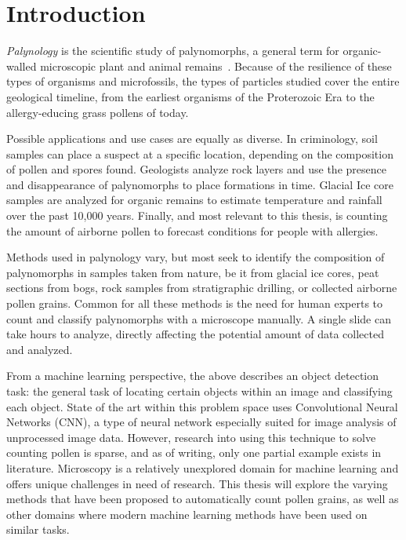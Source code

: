 \chapter{Introduction}\label{cha:Introduction}
\textit{Palynology} is the scientific study of palynomorphs, a general term for organic-walled microscopic plant and animal remains\ \parencite{askin_palynology_2003}.
Because of the resilience of these types of organisms and microfossils, the types of particles studied cover the entire geological timeline, from the earliest organisms of the Proterozoic Era to the allergy-educing grass pollens of today.

Possible applications and use cases are equally as diverse.
In criminology, soil samples can place a suspect at a specific location, depending on the composition of pollen and spores found.
Geologists analyze rock layers and use the presence and disappearance of palynomorphs to place formations in time.
Glacial Ice core samples are analyzed for organic remains to estimate temperature and rainfall over the past 10,000 years.
Finally, and most relevant to this thesis, is counting the amount of airborne pollen to forecast conditions for people with allergies.

Methods used in palynology vary, but most seek to identify the composition of palynomorphs in samples taken from nature, be it from glacial ice cores, peat sections from bogs, rock samples from stratigraphic drilling, or collected airborne pollen grains.
Common for all these methods is the need for human experts to count and classify palynomorphs with a microscope manually.
A single slide can take hours to analyze, directly affecting the potential amount of data collected and analyzed.

From a machine learning perspective, the above describes an object detection task: the general task of locating certain objects within an image and classifying each object.
State of the art within this problem space uses Convolutional Neural Networks (CNN), a type of neural network especially suited for image analysis of unprocessed image data.
However, research into using this technique to solve counting pollen is sparse, and as of writing, only one partial example exists in literature.
Microscopy is a relatively unexplored domain for machine learning and offers unique challenges in need of research.
This thesis will explore the varying methods that have been proposed to automatically count pollen grains, as well as other domains where modern machine learning methods have been used on similar tasks.

